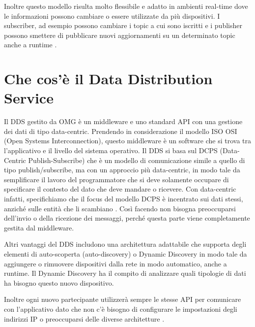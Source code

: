 Inoltre questo modello risulta molto
flessibile e adatto in ambienti real-time dove le informazioni
possono cambiare o essere utilizzate da più dispositivi.
I subscriber, ad esempio possono cambiare i topic a cui 
sono iscritti e i publisher possono smettere di pubblicare nuovi
aggiornamenti su un determinato topic anche a runtime \cite{OH2010318}.

\section{Che cos'è il Data Distribution Service}

Il DDS gestito da OMG è un middleware e uno standard API con una gestione
dei dati di tipo data-centric. 
Prendendo in considerazione il modello ISO OSI 
(Open Systems Interconnection), questo
middleware è un software che si trova tra l'applicativo e il livello
del sistema operativo.
Il DDS si basa sul DCPS (Data-Centric Publish-Subscribe) 
che è un modello di comunicazione simile a quello
di tipo publish/subscribe, ma con un approccio più data-centric, in modo
tale da semplificare il lavoro del programmatore che si deve solamente
occupare di specificare il contesto del dato che deve mandare o ricevere.
Con data-centric infatti, specifichiamo che il focus del modello DCPS 
è incentrato 
sui dati stessi, anziché sulle entità che li scambiano \cite{whatisdds}.
Così facendo non bisogna preoccuparsi dell'invio o della ricezione
dei messaggi, perché questa parte viene completamente gestita dal middleware.


Altri vantaggi del DDS includono una architettura adattabile che supporta
degli elementi di auto-scoperta (auto-discovery) o Dynamic Discovery 
in modo tale da aggiungere o 
rimuovere dispositivi dalla rete in modo automatico, anche a runtime.
Il Dynamic Discovery ha il compito di analizzare quali tipologie di dati 
ha bisogno questo nuovo dispositivo. 

Inoltre ogni nuovo partecipante 
utilizzerà sempre le stesse API per comunicare con l'applicativo dato che 
non c'è bisogno di configurare le impostazioni degli indirizzi IP o 
preoccuparsi delle diverse architetture \cite{1494965}.
 
